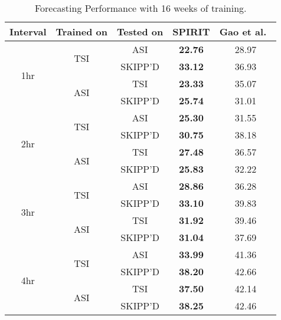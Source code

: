 \begin{table}[h]
  \caption{
  Forecasting Performance with 16 weeks of training.
  }
  \label{tab:sixteenweek_forecast}
  \centering
  \setlength{\tabcolsep}{2pt}
  \renewcommand{\arraystretch}{1.2} 
  \begin{tabular}{c c c c c}
    \hline
    \textbf{Interval} & \textbf{Trained on} & \textbf{Tested on} & \textbf{SPIRIT} & \textbf{Gao et al.~\cite{wacv2022}} \\
    \hline
    \multirow{4}{*}{1hr} & \multirow{2}{*}{TSI} & ASI & \textbf{22.76} & 28.97 \\
                          & & SKIPP'D & \textbf{33.12} & 36.93 \\
                          \cline{2-5}
                          & \multirow{2}{*}{ASI} & TSI & \textbf{23.33} & 35.07 \\
                          & & SKIPP'D & \textbf{25.74} & 31.01 \\
    \hline
    \multirow{4}{*}{2hr} & \multirow{2}{*}{TSI} & ASI & \textbf{25.30} & 31.55 \\
                          & & SKIPP'D & \textbf{30.75} & 38.18 \\
                          \cline{2-5}
                          & \multirow{2}{*}{ASI} & TSI & \textbf{27.48} & 36.57 \\
                          & & SKIPP'D & \textbf{25.83} & 32.22 \\
    \hline
    \multirow{4}{*}{3hr} & \multirow{2}{*}{TSI} & ASI & \textbf{28.86} & 36.28 \\
                          & & SKIPP'D & \textbf{33.10} & 39.83 \\
                          \cline{2-5}
                          & \multirow{2}{*}{ASI} & TSI & \textbf{31.92} & 39.46 \\
                          & & SKIPP'D & \textbf{31.04} & 37.69 \\
    \hline
    \multirow{4}{*}{4hr} & \multirow{2}{*}{TSI} & ASI & \textbf{33.99} & 41.36 \\
                          & & SKIPP'D & \textbf{38.20} & 42.66 \\
                          \cline{2-5}
                          & \multirow{2}{*}{ASI} & TSI & \textbf{37.50} & 42.14 \\
                          & & SKIPP'D & \textbf{38.25} & 42.46 \\
    \hline
  \end{tabular}
\end{table}


